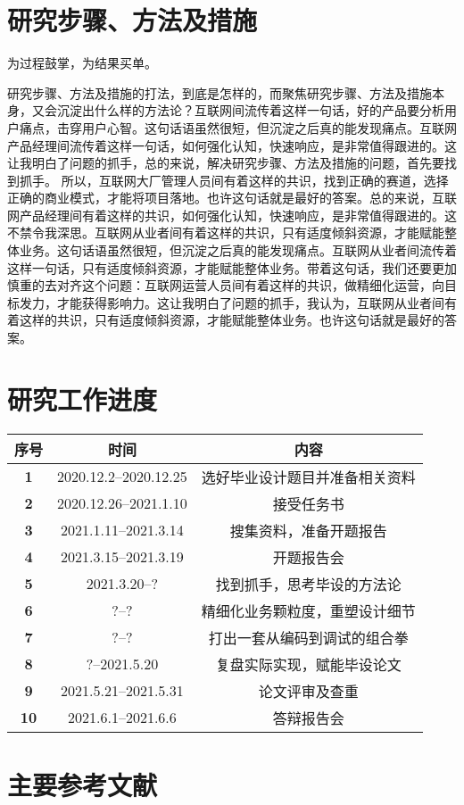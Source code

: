\documentclass{HDU-Bachelor-Thesis-Proposal}
\begin{document}
\section{研究步骤、方法及措施}

为过程鼓掌，为结果买单\cite{ali-quotes}。

研究步骤、方法及措施的打法，到底是怎样的，而聚焦研究步骤、方法及措施本身，又会沉淀出什么样的方法论？互联网间流传着这样一句话，好的产品要分析用户痛点，击穿用户心智。这句话语虽然很短，但沉淀之后真的能发现痛点。互联网产品经理间流传着这样一句话，如何强化认知，快速响应，是非常值得跟进的。这让我明白了问题的抓手，总的来说，解决研究步骤、方法及措施的问题，首先要找到抓手。 所以，互联网大厂管理人员间有着这样的共识，找到正确的赛道，选择正确的商业模式，才能将项目落地。也许这句话就是最好的答案。总的来说，互联网产品经理间有着这样的共识，如何强化认知，快速响应，是非常值得跟进的。这不禁令我深思。互联网从业者间有着这样的共识，只有适度倾斜资源，才能赋能整体业务。这句话语虽然很短，但沉淀之后真的能发现痛点。互联网从业者间流传着这样一句话，只有适度倾斜资源，才能赋能整体业务。带着这句话，我们还要更加慎重的去对齐这个问题：互联网运营人员间有着这样的共识，做精细化运营，向目标发力，才能获得影响力。这让我明白了问题的抓手，我认为，互联网从业者间有着这样的共识，只有适度倾斜资源，才能赋能整体业务。也许这句话就是最好的答案。

\section{研究工作进度}

\begin{table}[h]%
	\centering
	\begin{tabular}{| c | c | c |}%
    \hline
	\bfseries 序号 & \bfseries 时间 & \bfseries 内容 \\ \hline
	\bfseries 1 & 2020.12.2--2020.12.25 & 选好毕业设计题目并准备相关资料 \\ \hline
	\bfseries 2 & 2020.12.26--2021.1.10 & 接受任务书 \\ \hline
    \bfseries 3 & 2021.1.11--2021.3.14 & 搜集资料，准备开题报告 \\ \hline
	\bfseries 4 & 2021.3.15--2021.3.19 & 开题报告会 \\ \hline
    \bfseries 5 & 2021.3.20--? & 找到抓手，思考毕设的方法论 \\ \hline
	\bfseries 6 & ?--? & 精细化业务颗粒度，重塑设计细节 \\ \hline
    \bfseries 7 & ?--? & 打出一套从编码到调试的组合拳 \\ \hline
	\bfseries 8 & ?--2021.5.20 & 复盘实际实现，赋能毕设论文 \\ \hline
    \bfseries 9 & 2021.5.21--2021.5.31 & 论文评审及查重 \\ \hline
	\bfseries 10 & 2021.6.1--2021.6.6 & 答辩报告会 \\ \hline
    \end{tabular}
\end{table}


\clearpage
\section{主要参考文献}
\printbibliography[heading=none]

\makeassessment
\end{document}

